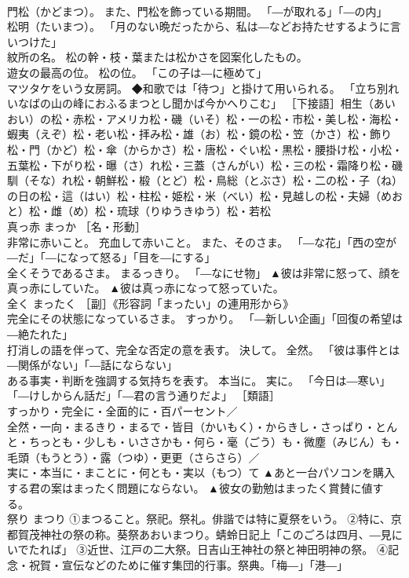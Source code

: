 \documentclass[8pt]{extreport}
\begin{document}
\begin{CJK}{UTF8}{min}
\\	門松（かどまつ）。 また、門松を飾っている期間。 「―が取れる」「―の内」 
\\	松明（たいまつ）。 「月のない晩だったから、私は―などお持たせするように言いつけた」 
\\	紋所の名。 松の幹・枝・葉または松かさを図案化したもの。 
\\	遊女の最高の位。 松の位。 「この子は―に極めて」 
\\	マツタケをいう女房詞。 ◆和歌では「待つ」と掛けて用いられる。 「立ち別れいなばの山の峰におふるまつとし聞かば今かへりこむ」 ［下接語］相生（あいおい）の松・赤松・アメリカ松・磯（いそ）松・一の松・市松・美し松・海松・蝦夷（えぞ）松・老い松・拝み松・雄（お）松・鏡の松・笠（かさ）松・飾り松・門（かど）松・傘（からかさ）松・唐松・ぐい松・黒松・腰掛け松・小松・五葉松・下がり松・曝（さ）れ松・三蓋（さんがい）松・三の松・霜降り松・磯馴（そな）れ松・朝鮮松・椴（とど）松・鳥総（とぶさ）松・二の松・子（ね）の日の松・這（はい）松・柱松・姫松・米（べい）松・見越しの松・夫婦（めおと）松・雌（め）松・琉球（りゆうきゆう）松・若松	
\\	真っ赤	まっか	［名・形動］ 
\\	非常に赤いこと。 充血して赤いこと。 また、そのさま。 「―な花」「西の空が―だ」「―になって怒る」「目を―にする」 
\\	全くそうであるさま。 まるっきり。 「―なにせ物」	▲彼は非常に怒って、顔を真っ赤にしていた。 ▲彼は真っ赤になって怒っていた。
\\	全く	まったく	［副］《形容詞「まったい」の連用形から》 
\\	完全にその状態になっているさま。 すっかり。 「―新しい企画」「回復の希望は―絶たれた」 
\\	打消しの語を伴って、完全な否定の意を表す。 決して。 全然。 「彼は事件とは―関係がない」「―話にならない」 
\\	ある事実・判断を強調する気持ちを表す。 本当に。 実に。 「今日は―寒い」「―けしからん話だ」「―君の言う通りだよ」 ［類語］
\\	すっかり・完全に・全面的に・百パーセント／
\\	全然・一向・まるきり・まるで・皆目（かいもく）・からきし・さっぱり・とんと・ちっとも・少しも・いささかも・何ら・毫（ごう）も・微塵（みじん）も・毛頭（もうとう）・露（つゆ）・更更（さらさら）／
\\	実に・本当に・まことに・何とも・実以（もつ）て	▲あと一台パソコンを購入する君の案はまったく問題にならない。 ▲彼女の勤勉はまったく賞賛に値する。
\\	祭り	まつり	①まつること。祭祀。祭礼。俳諧では特に夏祭をいう。 ②特に、京都賀茂神社の祭の称。葵祭あおいまつり。蜻蛉日記上「このごろは四月、―見にいでたれば」 ③近世、江戸の二大祭。日吉山王神社の祭と神田明神の祭。 ④記念・祝賀・宣伝などのために催す集団的行事。祭典。「梅―」「港―」	

\end{CJK}
\end{document}
